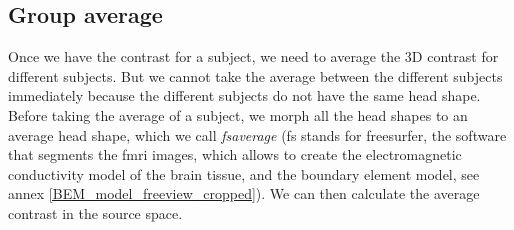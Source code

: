 \subsection{Group average}
Once we have the contrast for a subject, we need to average the 3D contrast for different subjects. But we cannot take the average between the different subjects immediately because the different subjects do not have the same head shape. Before taking the average of a subject, we morph all the head shapes to an average head shape, which we call \textit{fsaverage} (fs stands for freesurfer, the software that segments the fmri images, which allows to create the electromagnetic conductivity model of the brain tissue, and the boundary element model, see annex \ref{BEM_model_freeview_cropped}). We can then calculate the average contrast in the source space.

